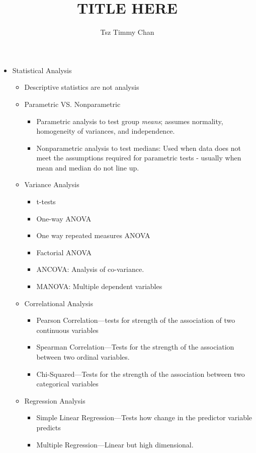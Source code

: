 \documentclass{TC}
\title{TITLE HERE}	%
\author{Tsz Timmy Chan}	%
\begin{document}
\begin{itemize}
\item Statistical Analysis
	
	\begin{itemize}
		\item Descriptive statistics are not analysis
		\item Parametric VS. Nonparametric
			\begin{itemize}
			\item Parametric analysis to test group \emph{means}; assumes normality, homogeneity of variances, and independence.
			\item Nonparametric analysis to test medians:
			Used when data does not meet the assumptions required for parametric tests - usually when mean and median do not line up.
			\end{itemize}
	\end{itemize}
	\begin{itemize}
	\item Variance Analysis
		\begin{itemize}
		\item t-tests
		\item One-way ANOVA
		\item One way repeated measures ANOVA
		\item Factorial ANOVA
		\item ANCOVA: Analysis of co-variance.
		\item MANOVA: Multiple dependent variables 
		\end{itemize}
	\item Correlational Analysis
		\begin{itemize}
		\item Pearson Correlation---tests for strength of the association of two continuous variables
		\item Spearman Correlation---Tests for the strength of the association between two ordinal variables.
		\item Chi-Squared---Tests for the strength of the association between two categorical variables
		\end{itemize}
	\item Regression Analysis
		\begin{itemize}
		\item Simple Linear Regression---Tests how change in the predictor variable predicts 
		\item Multiple Regression---Linear but high dimensional.
		\end{itemize}

\end{itemize}
\end{itemize}
\end{document}
